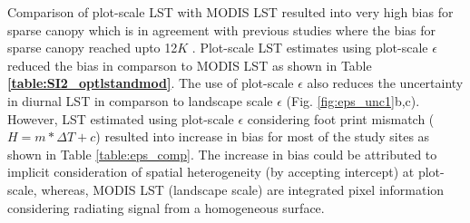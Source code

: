 \documentclass[fleqn,10pt]{wlscirep}
\begin{document}
Comparison of plot-scale LST with MODIS LST resulted into very high bias for sparse canopy which is in agreement with previous studies where the bias for sparse canopy reached upto 12$K$ \cite{guillevic2018land}. Plot-scale LST estimates using plot-scale $\epsilon$ reduced the bias in comparson to MODIS LST as shown in Table \textbf{\ref{table:SI2_optlstandmod}}. The use of plot-scale $\epsilon$ also reduces the uncertainty in diurnal LST in comparson to  landscape scale $\epsilon$ (Fig. \ref{fig:eps_unc1}b,c). However, LST estimated using plot-scale $\epsilon$ considering  foot print mismatch ($H=m*\Delta T +c$) resulted into increase in bias for most of the study sites as shown in Table \ref{table:eps_comp}. The increase in bias could be attributed to implicit consideration of spatial heterogeneity (by accepting intercept) at plot-scale, whereas, MODIS LST (landscape scale) are integrated pixel information considering radiating signal from a homogeneous surface.
\end{document}
